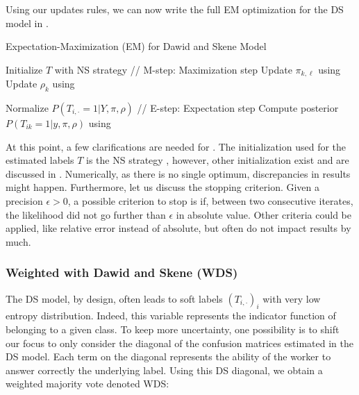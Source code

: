 Using our updates rules, we can now write the full EM optimization for the DS model in .

\begin{algorithm}
\caption{Expectation-Maximization (EM) for Dawid and Skene Model}
\label{alg:ds}
\begin{algorithmic}[1]
\STATE Initialize $T$ with NS strategy
    \STATE // M-step: Maximization step
            \STATE Update $\pi_{k,\ell}$ using 
        \ENDFOR
        \STATE Update $\rho_k$ using 
    \ENDFOR

    \STATE Normalize $P(T_{i,\cdot} = 1 | Y, \pi, \rho)$
    \STATE // E-step: Expectation step
            \STATE Compute posterior $P(T_{ik} = 1 | y, \pi, \rho)$ using 
        \ENDFOR
    \ENDFOR
\ENDWHILE
\end{algorithmic}
\end{algorithm}

At this point, a few clarifications are needed for .
The initialization used for the estimated labels $T$ is the NS strategy  , however, other initialization exist and are discussed in \citet{dawid_maximum_1979}.
Numerically, as there is no single optimum, discrepancies in results might happen.
Furthermore, let us discuss the stopping criterion.
Given a precision $\epsilon>0$, a possible criterion to stop is if, between two consecutive iterates, the likelihood did not go further than $\epsilon$ in absolute value.
Other criteria could be applied, like relative error instead of absolute, but often do not impact results by much.

\subsubsection{Weighted with Dawid and Skene (WDS)}
\label{subsub:wds}

The DS model, by design, often leads to soft labels $(T_{i,\cdot})_i$ with very low entropy distribution.
Indeed, this variable represents the indicator function of belonging to a given class.
To keep more uncertainty, one possibility is to shift our focus to only consider the diagonal of the confusion matrices estimated in the DS model.
Each term on the diagonal represents the ability of the worker to answer correctly the underlying label.
Using this DS diagonal, we obtain a weighted majority vote denoted WDS:

